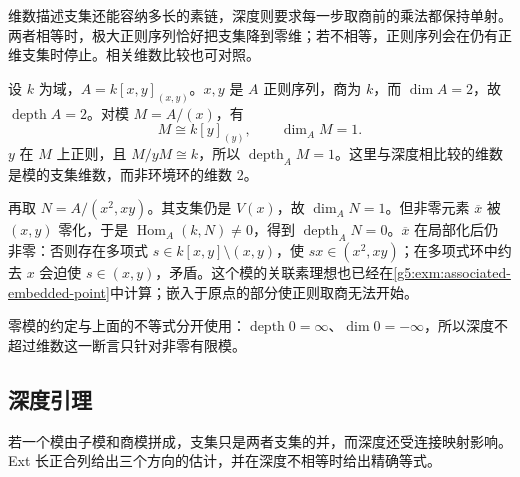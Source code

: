 维数描述支集还能容纳多长的素链，深度则要求每一步取商前的乘法都保持单射。两者相等时，极大正则序列恰好把支集降到零维；若不相等，正则序列会在仍有正维支集时停止。相关维数比较也可对照\cite[第16节，习题16.1，第132页；第17节，定理17.2，第134页]{Matsumura1989}。

\begin{example}\label{g5:exm:depth-support-dimension}
	设 \(k\) 为域，\(A=k[x,y]_{(x,y)}\)。\(x,y\) 是 \(A\) 正则序列，商为 \(k\)，而 \(\dim A=2\)，故 \(\operatorname{depth}A=2\)。对模 \(M=A/(x)\)，有
	\[
		M\cong k[y]_{(y)},\qquad \dim_A M=1.
	\]
	\(y\) 在 \(M\) 上正则，且 \(M/yM\cong k\)，所以 \(\operatorname{depth}_A M=1\)。这里与深度相比较的维数是模的支集维数，而非环境环的维数 \(2\)。

	再取 \(N=A/(x^2,xy)\)。其支集仍是 \(V(x)\)，故 \(\dim_A N=1\)。但非零元素 \(\overline x\) 被 \((x,y)\) 零化，于是 \(\operatorname{Hom}_A(k,N)\ne0\)，得到 \(\operatorname{depth}_A N=0\)。\(\overline x\) 在局部化后仍非零：否则存在多项式 \(s\in k[x,y]\setminus(x,y)\)，使 \(sx\in(x^2,xy)\)；在多项式环中约去 \(x\) 会迫使 \(s\in(x,y)\)，矛盾。这个模的关联素理想也已经在\cref{g5:exm:associated-embedded-point}中计算；嵌入于原点的部分使正则取商无法开始。
\end{example}

零模的约定与上面的不等式分开使用：\(\operatorname{depth}0=\infty\)、\(\dim0=-\infty\)，所以深度不超过维数这一断言只针对非零有限模。

\subsection{深度引理}
\label{g5:subsec:0803:04}

若一个模由子模和商模拼成，支集只是两者支集的并，而深度还受连接映射影响。Ext 长正合列给出三个方向的估计，并在深度不相等时给出精确等式。

